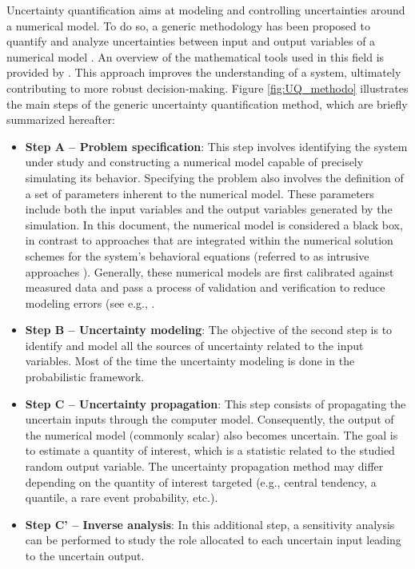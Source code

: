 Uncertainty quantification aims at modeling and controlling uncertainties around a numerical model. 
To do so, a generic methodology has been proposed to quantify and analyze uncertainties between input and output variables of a numerical model \citep{rocquigny_2008,blanchard_2023}. 
An overview of the mathematical tools used in this field is provided by \citet{sullivan_2015}. 
This approach improves the understanding of a system, ultimately contributing to more robust decision-making. 
Figure \ref{fig:UQ_methodo} illustrates the main steps of the generic uncertainty quantification method, which are briefly summarized hereafter: 
\begin{itemize}
    \item \textbf{Step A -- Problem specification}:     
    This step involves identifying the system under study and constructing a numerical model capable of precisely simulating its behavior. 
    Specifying the problem also involves the definition of a set of parameters inherent to the numerical model. 
    These parameters include both the input variables and the output variables generated by the simulation. 
    In this document, the numerical model is considered a black box, in contrast to approaches that are integrated within the numerical solution schemes for the system's behavioral equations (referred to as intrusive approaches \citep{lemaitre_2010}). 
    Generally, these numerical models are first calibrated against measured data and pass a process of validation and verification to reduce modeling errors (see e.g., \citep{oberkampf_2010_VVUQ,damblin_2015,carmassi_2018}.  
    \item \textbf{Step B -- Uncertainty modeling}: 
    The objective of the second step is to identify and model all the sources of uncertainty related to the input variables. 
    Most of the time the uncertainty modeling is done in the probabilistic framework.
    \item \textbf{Step C -- Uncertainty propagation}:
    This step consists of propagating the uncertain inputs through the computer model.  
    Consequently, the output of the numerical model (commonly scalar) also becomes uncertain. 
    The goal is to estimate a quantity of interest, which is a statistic related to the studied random output variable. 
    The uncertainty propagation method may differ depending on the quantity of interest targeted (e.g., central tendency, a quantile, a rare event probability, etc.).    
    \item \textbf{Step C' -- Inverse analysis}: 
    In this additional step, a sensitivity analysis can be performed to study the role allocated to each uncertain input leading to the uncertain output. 

\end{itemize}
